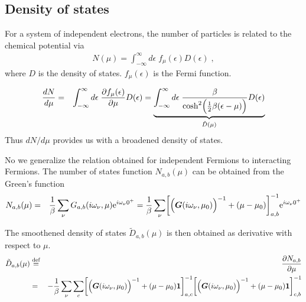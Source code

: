 \documentclass[11pt,a4paper]{report}
\begin{document}
\subsection{Density of states}
For a system of independent electrons, the number of particles is
related to the chemical potential via
\begin{eqnarray}
N(\mu)=\int_{-\infty}^\infty d\epsilon\; f_\mu(\epsilon) D(\epsilon)
\;,
\end{eqnarray}
where $D$ is the density of states. $f_\mu(\epsilon)$ is the Fermi function.

\begin{eqnarray}
\frac{dN}{d\mu}
&=&\int_{-\infty}^\infty d\epsilon\; 
\frac{\partial f_\mu(\epsilon)}{\partial\mu} D(\epsilon)
=
\underbrace{\int_{-\infty}^\infty d\epsilon\; 
\frac{\beta}{\cosh^2\Bigl(\frac{1}{2}\beta(\epsilon-\mu)\Bigr)} D(\epsilon)
}_{\tilde{D}(\mu)}
\end{eqnarray}
Thus $dN/d\mu$ provides us with a broadened density of states.

No we generalize the relation obtained for independent Fermions to
interacting Fermions. The number of states function $N_{a,b}(\mu)$ can
be obtained from the Green's function
\begin{eqnarray}
N_{a,b}(\mu)
&=&\frac{1}{\beta}\sum_\nu G_{a,b}(i\omega_\nu,\mu)\mathrm{e}^{i\omega_\nu0^+}
=\frac{1}{\beta}\sum_\nu 
\biggl[
\Bigl(\bm{G}(i\omega_\nu,\mu_0)
\Bigr)^{-1}+(\mu-\mu_0)\biggr]^{-1}_{a,b}\mathrm{e}^{i\omega_\nu0^+}
\end{eqnarray}

The smoothened density of states $\tilde{D}_{a,b}(\mu)$ is then
obtained as derivative with respect to $\mu$.
\begin{eqnarray}
\tilde{D}_{a,b}(\mu)&\stackrel{\text{def}}{=}&\frac{\partial N_{a,b}}{\partial\mu}
\nonumber\\
&=&
-\frac{1}{\beta}\sum_\nu 
\sum_c
\biggl[
\Bigl(\bm{G}(i\omega_\nu,\mu_0)
\Bigr)^{-1}+(\mu-\mu_0)\bm{1}\biggr]^{-1}_{a,c}
\biggl[
\Bigl(\bm{G}(i\omega_\nu,\mu_0)
\Bigr)^{-1}+(\mu-\mu_0)\bm{1}\biggr]^{-1}_{c,b}
\nonumber\\
\end{eqnarray}

\end{document}
